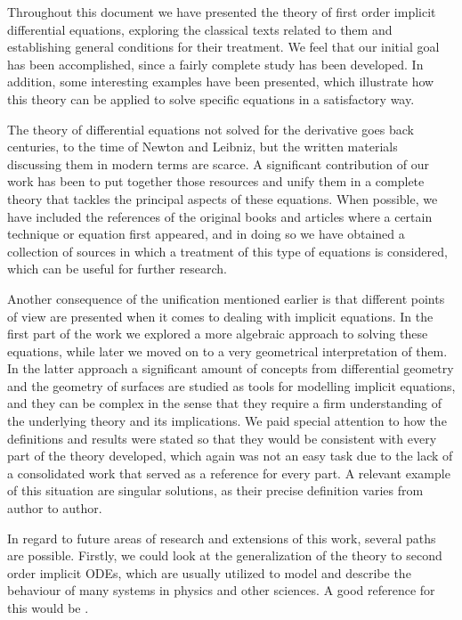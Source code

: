 %
%
%

Throughout this document we have presented the theory of first order implicit differential equations, exploring the classical texts related to them and establishing general conditions for their treatment. We feel that our initial goal has been accomplished, since a fairly complete study has been developed. In addition, some interesting examples have been presented, which illustrate how this theory can be applied to solve specific equations in a satisfactory way.

The theory of differential equations not solved for the derivative goes back centuries, to the time of Newton and Leibniz, but the written materials discussing them in modern terms are scarce. A significant contribution of our work has been to put together those resources and unify them in a complete theory that tackles the principal aspects of these equations. When possible, we have included the references of the original books and articles where a certain technique or equation first appeared, and in doing so we have obtained a collection of sources in which a treatment of this type of equations is considered, which can be useful for further research.

Another consequence of the unification mentioned earlier is that different points of view are presented when it comes to dealing with implicit equations. In the first part of the work we explored a more algebraic approach to solving these equations, while later we moved on to a very geometrical interpretation of them. In the latter approach a significant amount of concepts from differential geometry and the geometry of surfaces are studied as tools for modelling implicit equations, and they can be complex in the sense that they require a firm understanding of the underlying theory and its implications. We paid special attention to how the definitions and results were stated so that they would be consistent with every part of the theory developed, which again was not an easy task due to the lack of a consolidated work that served as a reference for every part. A relevant example of this situation are singular solutions, as their precise definition varies from author to author.

In regard to future areas of research and extensions of this work, several paths are possible. Firstly, we could look at the generalization of the theory to second order implicit ODEs, which are usually utilized to model and describe the behaviour of many systems in physics and other sciences. A good reference for this would be \cite{takahashi2007implicit}.

